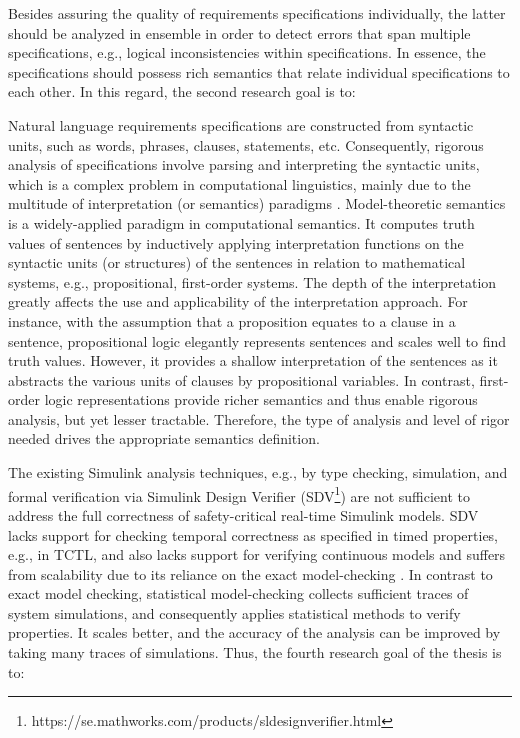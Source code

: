 Besides assuring the quality of requirements specifications individually, the latter should be analyzed in ensemble in order to detect errors that span multiple specifications, e.g., logical inconsistencies within specifications. In essence, the specifications should possess rich semantics that relate individual specifications to each other. In this regard, the second research goal is to:
\begin{researchgoal}
\end{researchgoal}

Natural language requirements specifications are constructed from syntactic units, such as words, phrases, clauses, statements, etc. Consequently, rigorous analysis of specifications involve parsing and interpreting the syntactic units, which is a complex problem in computational linguistics, mainly due to the multitude of interpretation (or semantics) paradigms \cite{Clark2010TheProcessing}. Model-theoretic semantics is a widely-applied paradigm in computational semantics. It computes truth values of sentences by inductively applying interpretation functions on the syntactic units (or structures) of the sentences in relation to mathematical systems, e.g., propositional, first-order systems. The depth of the interpretation greatly affects the use and applicability of the interpretation approach. For instance, with the assumption that a proposition equates to a clause in a sentence, propositional logic elegantly represents sentences and scales well to find truth values. However, it provides a shallow interpretation of the sentences as it abstracts the various units of clauses by propositional variables. In contrast, first-order logic representations provide richer semantics and thus enable rigorous analysis, but yet lesser tractable. Therefore, the type of analysis and level of rigor needed drives the appropriate semantics definition.

The existing Simulink analysis techniques, e.g., by type checking, simulation, and formal verification via Simulink Design Verifier (SDV\footnote{https://se.mathworks.com/products/sldesignverifier.html}) are not sufficient to address the full correctness of safety-critical real-time Simulink models. SDV lacks support for checking temporal correctness as specified in timed properties, e.g., in TCTL, and also lacks support for verifying continuous models and suffers from scalability due to its reliance on the exact model-checking \cite{Leitner2008SimulinkStudy}. In contrast to exact model checking, statistical model-checking collects sufficient traces of system simulations, and consequently applies statistical methods to verify properties. It scales better, and the accuracy of the analysis can be improved by taking many traces of simulations. Thus, the fourth research goal of the thesis is to:
\begin{researchgoal}
\end{researchgoal}

